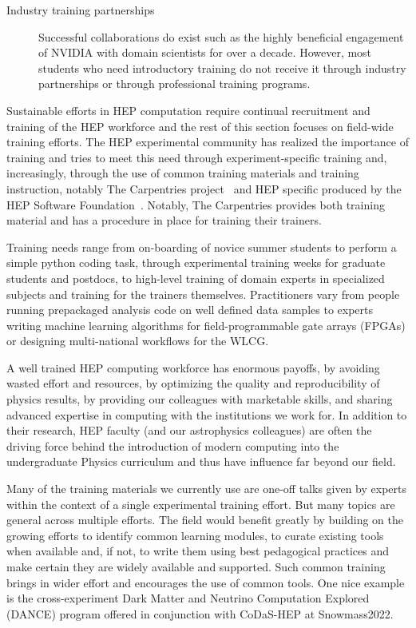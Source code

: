 \begin{description}
  \item [Industry training partnerships] Successful collaborations do exist such as the highly beneficial engagement of NVIDIA with domain scientists for over a decade.  However, most students who need introductory training do not receive it through industry partnerships or through professional training programs.   
\end{description}

  \begin{comment}
    We need to make an effort to find the underlying challenges so that together we can address R\&D challenges in diverse teams. 
  \end{comment}

Sustainable efforts in HEP computation require continual recruitment and training of  the HEP workforce and the rest of this section focuses on field-wide training efforts. The HEP experimental community has realized the importance of training and tries to meet this need through experiment-specific training and, increasingly, through the use of common training materials and training instruction, notably The Carpentries project~\cite{Carpentries} and HEP specific produced by the HEP Software Foundation~\cite{Malik_2021}.  Notably, The Carpentries provides both training material and has a procedure in place for training their trainers.

Training needs range from on-boarding of novice summer students to perform a simple python coding task, through experimental training weeks for graduate students and postdocs, to high-level training of domain experts in specialized subjects and training for the trainers themselves. Practitioners vary from people running prepackaged analysis code on well defined data samples to experts writing machine learning algorithms for field-programmable gate arrays (FPGAs) or designing multi-national workflows for the WLCG.  

A well trained HEP computing workforce has enormous payoffs, by avoiding wasted effort and resources, by optimizing the quality and reproducibility of physics results, by providing our colleagues with marketable skills, and sharing advanced expertise in computing with the institutions we work for.  In addition to their research, HEP faculty (and our astrophysics colleagues)  are often the driving force behind the introduction of  modern computing into the undergraduate Physics curriculum and thus have influence far beyond our field.  

Many of the training materials we currently use are one-off talks given by experts within the context of a single experimental training effort.  But many topics are general across multiple efforts.  The field would benefit greatly by building on the growing efforts to identify common learning modules,  to curate existing tools when available and, if not, to write them using best pedagogical practices and make certain they are widely available and supported.    Such common training brings in wider effort and encourages the use of common tools.  One nice example is the cross-experiment Dark Matter and Neutrino Computation Explored (DANCE) program offered in conjunction  with CoDaS-HEP at  Snowmass2022.

